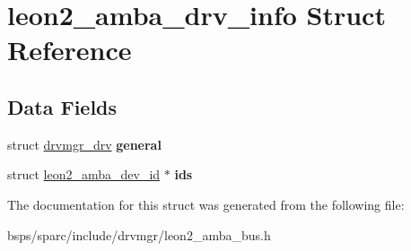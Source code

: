 \hypertarget{structleon2__amba__drv__info}{}\section{leon2\+\_\+amba\+\_\+drv\+\_\+info Struct Reference}
\label{structleon2__amba__drv__info}
\subsection*{Data Fields}
\begin{DoxyCompactItemize}
\item 
\mbox{\label{structleon2__amba__drv__info_a872f75a298a3f5082991c701aaee596a}} 
struct \mbox{\hyperlink{structdrvmgr__drv}{drvmgr\+\_\+drv}} {\bfseries general}
\item 
\mbox{\label{structleon2__amba__drv__info_ad45ea970e672b83c96924ceb455a3c69}} 
struct \mbox{\hyperlink{structleon2__amba__dev__id}{leon2\+\_\+amba\+\_\+dev\+\_\+id}} $\ast$ {\bfseries ids}
\end{DoxyCompactItemize}


The documentation for this struct was generated from the following file\+:\begin{DoxyCompactItemize}
\item 
bsps/sparc/include/drvmgr/leon2\+\_\+amba\+\_\+bus.\+h\end{DoxyCompactItemize}
